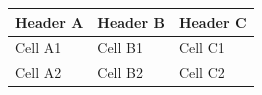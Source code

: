 \documentclass{article}
\begin{document}
\begin{tabular}{|l|l|l|}
\hline
Header A & Header B & Header C \\
\hline
Cell A1 & Cell B1 & Cell C1 \\
\hline
Cell A2 & Cell B2 & Cell C2 \\
\hline
\end{tabular}
\end{document}
